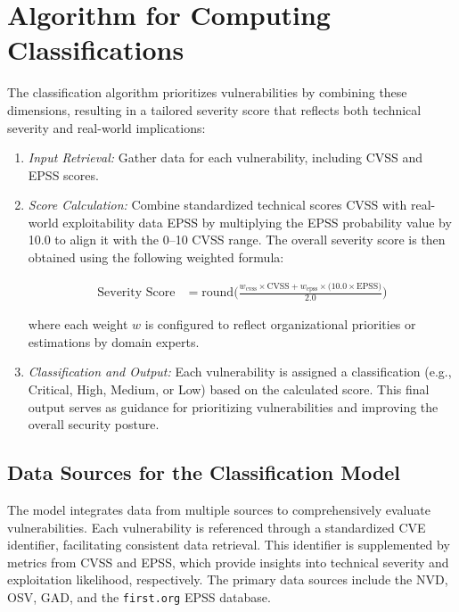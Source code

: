 \section{Algorithm for Computing Classifications}
\label{sec:algorithm-classifications}

The classification algorithm prioritizes vulnerabilities by combining these dimensions, resulting in a tailored severity score that reflects both technical severity and real-world implications:

\begin{enumerate}
    \item \textit{Input Retrieval:} Gather data for each vulnerability, including \ac{CVSS} and \ac{EPSS} scores.

    \item \textit{Score Calculation:} Combine standardized technical scores \ac{CVSS} with real-world exploitability data \ac{EPSS} by multiplying the \ac{EPSS} probability value by 10.0 to align it with the 0--10 \ac{CVSS} range. The overall severity score is then obtained using the following weighted formula:

\begin{align*}
\text{Severity Score} 
&= \mathrm{round}\Biggl(
    \frac{
        w_{\text{cvss}} \times \text{CVSS}
        + w_{\text{epss}} \times \bigl(10.0 \times \text{EPSS}\bigr)
    }{2.0}
\Biggr)
\end{align*}

    where each weight \( w \) is configured to reflect organizational priorities or estimations by domain experts.

    \item \textit{Classification and Output:} Each vulnerability is assigned a classification (e.g., Critical, High, Medium, or Low) based on the calculated score. This final output serves as guidance for prioritizing vulnerabilities and improving the overall security posture.
\end{enumerate}

\subsection{Data Sources for the Classification Model}
\label{subsec:classification-data-sources}

The model integrates data from multiple sources to comprehensively evaluate vulnerabilities. Each vulnerability is referenced through a standardized \ac{CVE} identifier, facilitating consistent data retrieval. This identifier is supplemented by metrics from \ac{CVSS} and \ac{EPSS}, which provide insights into technical severity and exploitation likelihood, respectively. The primary data sources include the \ac{NVD}, \ac{OSV}, \ac{GAD}, and the \texttt{first.org} EPSS database.

